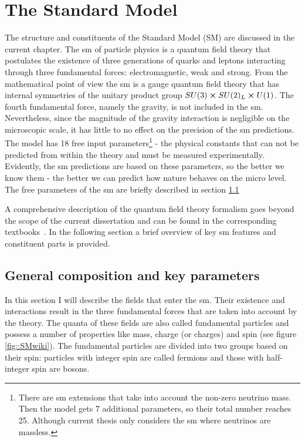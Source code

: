 \chapter{The Standard Model}
\label{ch:the_sm}
    
    The structure and constituents of the Standard Model (SM) are discussed in the current chapter. The \gls{sm} of particle physics is a quantum field theory that postulates the existence of three generations of quarks and leptons interacting through three fundamental forces: electromagnetic, weak and strong. From the mathematical point of view the \gls{sm} is a gauge quantum field theory that has internal symmetries of the unitary product group $SU(3)\cross SU(2)_L \cross U(1)$.  The fourth fundamental force, namely the gravity, is not included in the \gls{sm}. Nevertheless, since the magnitude of the gravity interaction is negligible on the microscopic scale, it has little to no effect on the precision of the \gls{sm} predictions. The model has 18 free input parameters\footnote{There are \gls{sm} extensions that take into account the non-zero neutrino mass. Then the model gets 7 additional parameters, so their total number reaches 25. Although current thesis only considers the \gls{sm} where neutrinos are massless.} - the physical constants that can not be predicted from within the theory and must be measured experimentally. Evidently, the \gls{sm} predictions are based on these parameters, so the better we know them - the better we can predict how nature behaves on the micro level. The free parameters of the \gls{sm} are briefly described in section \ref{sec::sm_gen}

	A comprehensive description of the quantum field theory formalism goes beyond the scope of the current dissertation and can be found in the corresponding textbooks~\cite{Peskin,bogol,Srednicki,Berest,weinberg,Griffiths}. In the following section a brief overview of key \gls{sm} features and constituent parts is provided.         
 \section{General composition and key parameters}
 \label{sec::sm_gen}
	In this section I will describe the fields that enter the \gls{sm}. Their existence and interactions result in the three fundamental forces that are taken into account by the theory. The quanta of these fields are also called fundamental particles and possess a number of properties like mass, charge (or charges) and spin (see figure \ref{fig::SMwiki}). The fundamental particles are divided into two groups based on their spin: particles with integer spin are called fermions and those with half-integer spin are bosons. 
	
